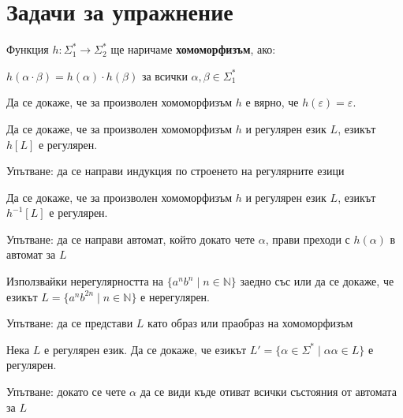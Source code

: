 \section{Задачи за упражнение}

\begin{definition}
    Функция $h : \Sigma_1^* \rightarrow \Sigma_2^*$ ще наричаме \textbf{хомоморфизъм}, ако:
    \begin{center}
        $h(\alpha \cdot \beta) = h(\alpha) \cdot h(\beta)$ за всички $\alpha, \beta \in \Sigma_1^*$
    \end{center}
\end{definition}

\begin{problem}
Да се докаже, че за произволен хомоморфизъм $h$ е вярно, че $h(\varepsilon) = \varepsilon$.
\end{problem}

\begin{problem}
Да се докаже, че за произволен хомоморфизъм $h$ и регулярен език $L$, езикът $h[L]$ е регулярен.

Упътване: да се направи индукция по строенето на регулярните езици
\end{problem}

\begin{problem}
Да се докаже, че за произволен хомоморфизъм $h$ и регулярен език $L$, езикът $h^{-1}[L]$ е регулярен.

Упътване: да се направи автомат, който докато чете $\alpha$, прави преходи с $h(\alpha)$ в автомат за $L$
\end{problem}

\begin{problem}
Използвайки нерегулярността на $\{ a^nb^n \mid n \in \mathbb{N} \}$ заедно със  или  да се докаже, че езикът $L = \{ a^nb^{2n} \mid n \in \mathbb{N} \}$ е нерегулярен.

Упътване: да се представи $L$ като образ или праобраз на хомоморфизъм
\end{problem}

\begin{problem}
Нека $L$ е регулярен език. Да се докаже, че езикът $L' = \{ \alpha \in \Sigma^* \mid \alpha \alpha \in L \}$ е регулярен.

Упътване: докато се чете $\alpha$ да се види къде отиват всички състояния от автомата за $L$
\end{problem}

